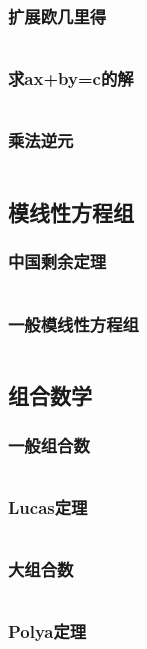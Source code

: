     \subsubsection{扩展欧几里得}
      \inputminted{cpp}{src/3_数学/3_扩展欧几里得-乘法逆元/1_扩展欧几里得.cpp}
    \subsubsection{求ax+by=c的解}
      \inputminted{cpp}{src/3_数学/3_扩展欧几里得-乘法逆元/2_求ax+by=c的解.cpp}
    \subsubsection{乘法逆元}
      \inputminted{cpp}{src/3_数学/3_扩展欧几里得-乘法逆元/3_乘法逆元.cpp}
  \subsection{模线性方程组}
    \subsubsection{中国剩余定理}
      \inputminted{cpp}{src/3_数学/4_模线性方程组/1_中国剩余定理.cpp}
    \subsubsection{一般模线性方程组}
      \inputminted{cpp}{src/3_数学/4_模线性方程组/2_一般模线性方程组.cpp}
  \subsection{组合数学}
    \subsubsection{一般组合数}
      \inputminted{cpp}{src/3_数学/5_组合数学/1_一般组合数.cpp}
    \subsubsection{Lucas定理}
      \inputminted{cpp}{src/3_数学/5_组合数学/2_Lucas定理.cpp}
    \subsubsection{大组合数}
      \inputminted{cpp}{src/3_数学/5_组合数学/3_大组合数.cpp}
    \subsubsection{Polya定理}
      \inputminted{cpp}{src/3_数学/5_组合数学/4_Polya定理.cpp}
